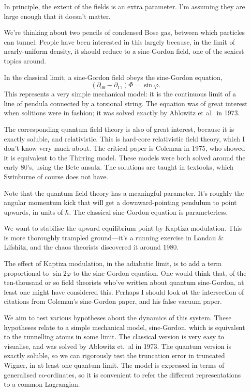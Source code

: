 In principle, the extent of the fields is an extra parameter.  I'm assuming they are large enough that it doesn't matter.

We're thinking about two pencils of condensed Bose gas, between which particles can tunnel.  People have been interested in this largely because, in the limit of nearly-uniform density, it should reduce to a sine-Gordon field, one of the sexiest topics around.

In the classical limit, a sine-Gordon field obeys the sine-Gordon equation, $$(∂_{00}-∂_{11})Φ=\sin φ.$$  This represents a very simple mechanical model: it is the continuous limit of a line of pendula connected by a torsional string.  The equation was of great interest when solitions were in fashion; it was solved exactly by Ablowitz et al.\ in 1973.

The corresponding quantum field theory is also of great interest, because it is exactly soluble, and relativistic.  This is hard-core relativistic field theory, which I don't know very much about.  The critical paper is Coleman in 1975, who showed it is equivalent to the Thirring model.  These models were both solved around the early 80's, using the Bete ansatz.  The solutions are taught in textooks, which Swinburne of course does not have.

Note that the quantum field theory has a meaningful parameter.  It's roughly the angular momentum kick that will get a downward-pointing pendulum to point upwards, in units of $\hbar$.  The classical sine-Gordon equation is parameterless.

We want to stabilise the upward equilibrium point by Kaptiza modulation.  This is more thoroughly trampled ground—it's a running exercise in Landau \& Lifshitz, and the chaos theorists discovered it around 1980.

The effect of Kaptiza modulation, in the adiabatic limit, is to add a term proportional to $\sin 2φ$ to the sine-Gordon equation.  One would think that, of the ten-thousand or so field theorists who've written about quantum sine-Gordon, at least one might have considered this.  Perhaps I should look at the intersection of citations from Coleman's sine-Gordon paper, and his false vacuum paper.



We aim to test various hypotheses about the dynamics of this system.  These hypotheses relate to a simple mechanical model, sine-Gordon, which is equivalent to the tunnelling atoms in some limit.  The classical version is very easy to visualise, and was solved by Ablowitz et.\ al in 1973.  The quantum version is exactly soluble, so we can rigorously test the truncation error in truncated Wigner, in at least one quantum limit.  The model is expressed in terms of generalised co-ordinates, so it is convenient to refer the different representations to a common Lagrangian.

